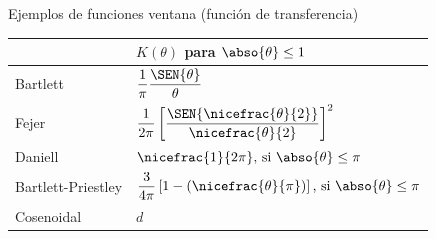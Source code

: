 \begin{SidewaysTable}
\caption{Ejemplos de funciones ventana (función de transferencia)}
\centering
{
\begin{tabular}{ll}
\toprule
& $K(\theta)$ para $\abso{\theta} \leq 1$ \\
\midrule
Bartlett &
$\displaystyle 
\frac{1}{\pi} \frac{\SEN{\theta}}{\theta}
$
\\
\rowcolor{gris}
Fejer &
$\displaystyle 
\frac{1}{2\pi} \left[ \frac{\SEN{\nicefrac{\theta}{2}}}{\nicefrac{\theta}{2}} \right]^{2}
$
\\
Daniell &
$
\displaystyle 
\nicefrac{1}{2\pi} \text{, si } \abso{\theta}\leq \pi
$
\\
\rowcolor{gris}
Bartlett-Priestley &
$\displaystyle 
\frac{3}{4 \pi} \left[ 1 - \left( \nicefrac{\theta}{\pi} \right) \right]
\text{, si } \abso{\theta}\leq \pi
$
\\
Cosenoidal &
$\displaystyle 
d
$
\\
\bottomrule
\end{tabular}
}
\end{SidewaysTable}


